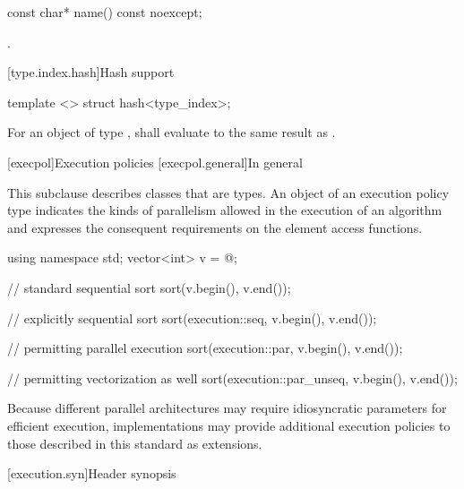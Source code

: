 %
\begin{itemdecl}
const char* name() const noexcept;
\end{itemdecl}

\begin{itemdescr}
\pnum
\returns {}.
\end{itemdescr}

[type.index.hash]{Hash support}

%
\begin{itemdecl}
template <> struct hash<type_index>;
\end{itemdecl}

\begin{itemdescr}
\pnum
For an object  of type ,
 shall evaluate to the same result as .
\end{itemdescr}

[execpol]{Execution policies}
[execpol.general]{In general}

\pnum
This subclause describes classes that are  types. An
object of an execution policy type indicates the kinds of parallelism allowed
in the execution of an algorithm and expresses the consequent requirements on
the element access functions.
\begin{example}
\begin{codeblock}
using namespace std;
vector<int> v = @\commentellip@;

// standard sequential sort
sort(v.begin(), v.end());

// explicitly sequential sort
sort(execution::seq, v.begin(), v.end());

// permitting parallel execution
sort(execution::par, v.begin(), v.end());

// permitting vectorization as well
sort(execution::par_unseq, v.begin(), v.end());
\end{codeblock}
\end{example}
\begin{note}
Because different parallel architectures may require idiosyncratic
parameters for efficient execution, implementations
may provide additional execution policies to those described in this
standard as extensions.
\end{note}

[execution.syn]{Header  synopsis}

